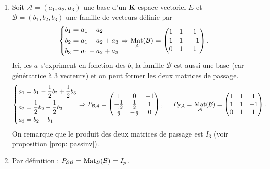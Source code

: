 \begin{exples}
 \begin{enumerate}
  \item Soit $\mathcal{A} = (a_1,a_2,a_3)$ une base d'un $\mathbf{K}$-espace vectoriel $E$ et $\mathcal{B}=(b_1,b_2,b_3)$ une famille de vecteurs définie par 
\[
 \left\lbrace 
 \begin{aligned}
  b_1 &= a_1 + a_2 \\
  b_2 &= a_1 + a_2 + a_3 \\
  b_3 &= a_1 -a_2 + a_3
 \end{aligned}
\right. \Rightarrow
\mathop{\mathrm{Mat}}_{\mathcal{A}}(\mathcal{B})
= \begin{pmatrix}
 1 & 1 & 1 \\
 1 & 1 & -1 \\
 0 & 1 & 1
  \end{pmatrix}
.
\]
Ici, les $a$ s'expriment en fonction des $b$, la famille $\mathcal{B}$ est aussi une base (car génératrice à 3 vecteurs) et on peut former les deux matrices de passage.
\[
\left\lbrace 
\begin{aligned}
 a_1 &= b_1 -\frac{1}{2} b_2 + \frac{1}{2}b_3\\
 a_2 &= \frac{1}{2}b_2 - \frac{1}{2}b_3\\
 a_3 &= b_2 - b_1
\end{aligned}
\right. \Rightarrow
P_{\mathcal{B} \mathcal{A}}=
\begin{pmatrix}
 1 & 0 & -1 \\
 -\frac{1}{2} & \frac{1}{2} &1 \\
 \frac{1}{2} & -\frac{1}{2} & 0
\end{pmatrix}, \hspace{0.5cm}
P_{\mathcal{B} \mathcal{A}} = \mathop{\mathrm{Mat}}_{\mathcal{A}}(\mathcal{B})
= \begin{pmatrix}
 1 & 1 & 1 \\
 1 & 1 & -1 \\
 0 & 1 & 1
  \end{pmatrix}
.
\]
On remarque que le produit des deux matrices de passage est $I_3$ (voir proposition \ref{prop: passinv}).
  \item Par définition : $P_{\mathcal B \mathcal B}= \mathop{\mathrm{Mat}}_\mathcal B (\mathcal B)=I_p$.
 \end{enumerate}
\end{exples}

